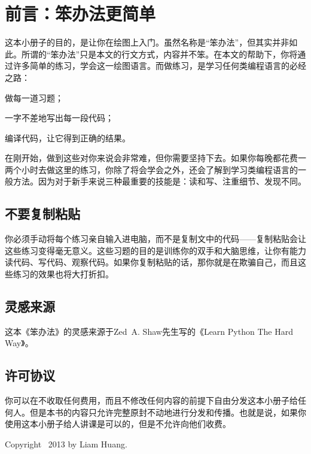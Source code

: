 \section*{前言：笨办法更简单} %
\label{sec:前言_笨办法更简单}
这本小册子的目的，是让你在\TikZ 绘图上入门。虽然名称是“笨办法”，但其实并非如此。所谓的“笨办法”只是本文的行文方式，内容并不笨。在本文的帮助下，你将通过许多简单的练习，学会\TikZ 这一绘图语言。而做练习，是学习任何类编程语言的必经之路：

\begin{compactitem}
	\item 做每一道习题；
	\item 一字不差地写出每一段代码；
	\item 编译代码，让它得到正确的结果。
\end{compactitem}

在刚开始，做到这些对你来说会非常难，但你需要坚持下去。如果你每晚都花费一两个小时去做这里的练习，你除了将会学会\TikZ 之外，还会了解到学习类编程语言的一般方法。因为对于新手来说三种最重要的技能是：读和写、注重细节、发现不同。

\subsection*{不要复制粘贴} %
\label{sub:不要复制粘贴}
你必须手动将每个练习亲自输入进电脑，而不是复制文中的代码——复制粘贴会让这些练习变得毫无意义。这些习题的目的是训练你的双手和大脑思维，让你有能力读代码、写代码、观察代码。如果你复制粘贴的话，那你就是在欺骗自己，而且这些练习的效果也将大打折扣。

\subsection*{灵感来源} %
\label{sub:灵感来源}
这本《笨办法》的灵感来源于Zed~A. Shaw先生写的《Learn Python The Hard Way》。

\subsection*{许可协议} %
\label{sub:许可协议}
你可以在不收取任何费用，而且不修改任何内容的前提下自由分发这本小册子给任何人。但是本书的内容只允许完整原封不动地进行分发和传播。也就是说，如果你使用这本小册子给人讲课是可以的，但是不允许向他们收费。

Copyright \textcopyright~2013 by Liam Huang.
